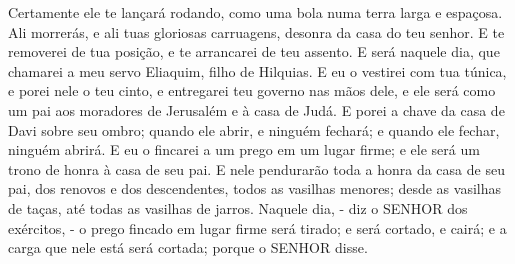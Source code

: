 {  Certamente ele te lançará rodando, como uma bola numa terra larga e espaçosa. Ali morrerás, e ali
{} tuas gloriosas carruagens,
{} desonra da casa do teu senhor.
  E te removerei de tua posição, e te arrancarei de teu assento.
  E será naquele dia, que chamarei a meu servo Eliaquim, filho de Hilquias.
  E eu o vestirei com tua túnica, e porei nele o teu cinto, e entregarei teu governo nas mãos dele, e ele será como um pai aos moradores de Jerusalém e à casa de Judá.
  E porei a chave da casa de Davi sobre seu ombro; quando ele abrir, e ninguém fechará; e quando ele fechar, ninguém abrirá.
  E eu o fincarei
{} a um prego em um lugar firme; e ele será um trono de honra à casa de seu pai.
  E nele pendurarão toda a honra da casa de seu pai, dos renovos e dos descendentes, todos as vasilhas menores; desde as vasilhas de taças, até todas as vasilhas de jarros.
  Naquele dia, - diz o SENHOR dos exércitos, - o prego fincado em lugar firme será tirado; e será cortado, e cairá; e a carga que nele está será cortada; porque
{} o SENHOR disse.
\par }

